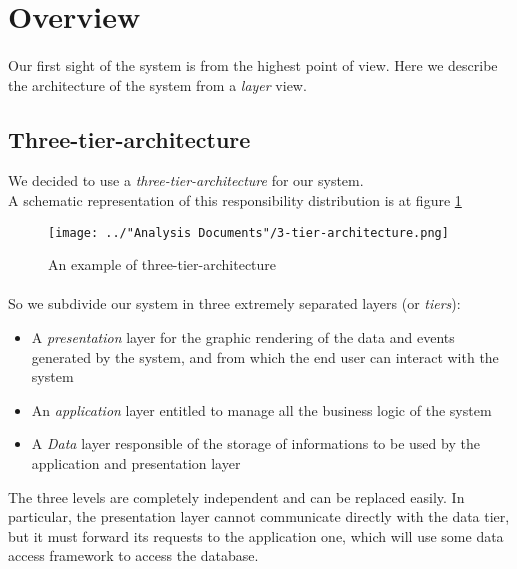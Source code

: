 \section{Overview}
\paragraph{}Our first sight of the system is from the highest point of view. Here we describe the architecture of the system from a \textit{layer} view.

\subsection{Three-tier-architecture}
We decided to use a \textit{three-tier-architecture} for our system.\\
A schematic representation of this responsibility distribution is at figure \ref{fig:3-tier-architecture}

\begin{figure}[H]
	\centering
	\texttt{[image: ../"Analysis Documents"/3-tier-architecture.png]}
	\label{fig:3-tier-architecture}
	\caption{An example of three-tier-architecture}
\end{figure}
\paragraph{} So we subdivide our system in three extremely separated layers (or \textit{tiers}):
\begin{itemize}
	\item A \textit{presentation} layer for the graphic rendering of the data and events generated by the system, and from which the end user can interact with the system
	\item An \textit{application} layer entitled to manage all the business logic of the system
	\item A \textit{Data} layer responsible of the storage of informations to be used by the application and presentation layer
\end{itemize}
The three levels are completely independent and can be replaced easily. In particular, the presentation layer cannot communicate directly with the data tier, but it must forward its requests to the application one, which will use some data access framework to access the database.
